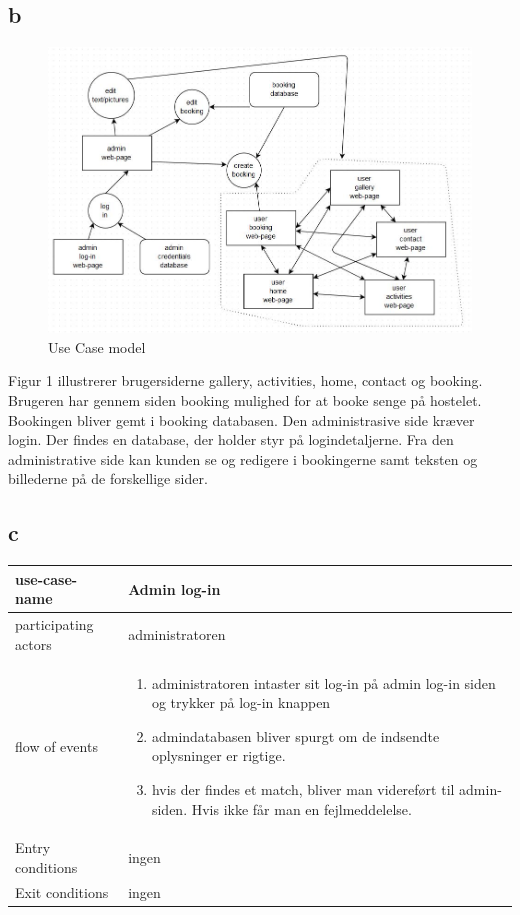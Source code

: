 \documentclass[12pt,a4paper]{article}
\begin{document}
\subsection{b}
\begin{figure}[H]
\centering
\includegraphics[scale=0.7]{usecasemodelV2.jpg}
\caption{Use Case model}
\end{figure}
Figur 1 illustrerer brugersiderne gallery, activities, home, contact og booking. Brugeren har gennem siden booking mulighed for at booke senge på hostelet. Bookingen bliver gemt i booking databasen. Den administrasive side kræver login. Der findes en database, der holder styr på logindetaljerne. Fra den administrative side kan kunden se og redigere i bookingerne samt teksten og billederne på de forskellige sider.\\
\subsection{c}

\begin{minipage}{\textwidth}

 \label{tab:title}
\begin{tabular}{| p{5cm} p{10cm} |}
\hline use-case-name & Admin log-in \\
\hline participating actors & administratoren \\
\hline flow of events & \begin{enumerate}
\item administratoren intaster sit log-in på admin log-in siden og trykker på log-in knappen
\item admindatabasen bliver spurgt om de indsendte oplysninger er rigtige.
\item hvis der findes et match, bliver man videreført til admin-siden. Hvis ikke får man en fejlmeddelelse.
\end{enumerate} \\
\hline Entry conditions & ingen \\
\hline Exit conditions & ingen \\
\hline
\end{tabular}

\end{minipage}
\end{document}

